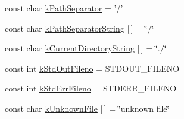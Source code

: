\begin{DoxyCompactItemize}
\item 
const char \hyperlink{namespacetesting_1_1internal_a75d57ad7e8a7b67ff04ff8855f90acc7}{k\-Path\-Separator} = '/'
\item 
const char \hyperlink{namespacetesting_1_1internal_a4fb543ce3f3235db81a8a266cbc335cb}{k\-Path\-Separator\-String} \mbox{[}$\,$\mbox{]} = \char`\"{}/\char`\"{}
\item 
const char \hyperlink{namespacetesting_1_1internal_a3a1c5c5e8ecf330ad74a3983ba59f09a}{k\-Current\-Directory\-String} \mbox{[}$\,$\mbox{]} = \char`\"{}./\char`\"{}
\item 
const int \hyperlink{namespacetesting_1_1internal_ac5717c0e061ab29ba48cf0929e3f3c8d}{k\-Std\-Out\-Fileno} = \-S\-T\-D\-O\-U\-T\-\_\-\-F\-I\-L\-E\-N\-O
\item 
const int \hyperlink{namespacetesting_1_1internal_a5bfafb8c85988c397157e055965ad46c}{k\-Std\-Err\-Fileno} = \-S\-T\-D\-E\-R\-R\-\_\-\-F\-I\-L\-E\-N\-O
\item 
const char \hyperlink{namespacetesting_1_1internal_a2fca93647e94e7b89bec4352991a5a6e}{k\-Unknown\-File} \mbox{[}$\,$\mbox{]} = \char`\"{}unknown file\char`\"{}
\end{DoxyCompactItemize}


